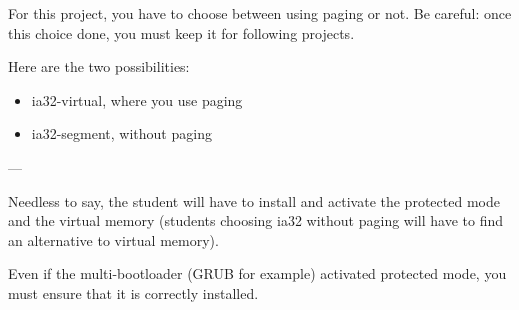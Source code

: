 For this project,  you have to choose between using  paging or not. Be
careful:  once  this choice  done,  you  must  keep it  for  following
projects.

Here are the two possibilities:

\begin{itemize}
\item ia32-virtual, where you use paging
\item ia32-segment, without paging
\end{itemize}

---

Needless to  say, the  student will have  to install and  activate the
protected mode and the  virtual memory (students choosing ia32 without
paging will have to find an alternative to virtual memory).

Even if  the multi-bootloader  (GRUB for example)  activated protected
mode, you must ensure that it is correctly installed.

